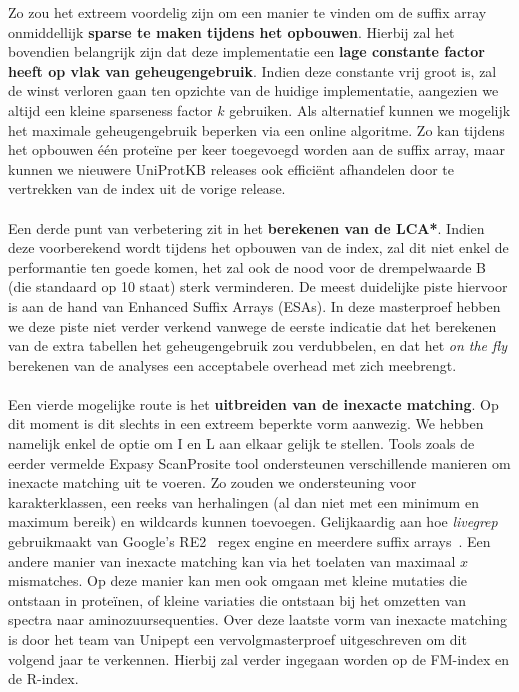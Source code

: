 Zo zou het extreem voordelig zijn om een manier te vinden om de suffix array onmiddellijk \textbf{sparse te maken tijdens het opbouwen}.
Hierbij zal het bovendien belangrijk zijn dat deze implementatie een \textbf{lage constante factor heeft op vlak van geheugengebruik}.
Indien deze constante vrij groot is, zal de winst verloren gaan ten opzichte van de huidige implementatie, aangezien we altijd een kleine sparseness factor $k$ gebruiken.
Als alternatief kunnen we mogelijk het maximale geheugengebruik beperken via een online algoritme.
Zo kan tijdens het opbouwen één proteïne per keer toegevoegd worden aan de suffix array, maar kunnen we nieuwere UniProtKB releases ook efficiënt afhandelen door te vertrekken van de index uit de vorige release.
\\ \\
Een derde punt van verbetering zit in het \textbf{berekenen van de LCA*}.
Indien deze voorberekend wordt tijdens het opbouwen van de index, zal dit niet enkel de performantie ten goede komen, het zal ook de nood voor de drempelwaarde B (die standaard op 10 staat) sterk verminderen.
De meest duidelijke piste hiervoor is aan de hand van Enhanced Suffix Arrays (ESAs).
In deze masterproef hebben we deze piste niet verder verkend vanwege de eerste indicatie dat het berekenen van de extra tabellen het geheugengebruik zou verdubbelen, en dat het \textit{on the fly} berekenen van de analyses een acceptabele overhead met zich meebrengt.
\\ \\
Een vierde mogelijke route is het \textbf{uitbreiden van de inexacte matching}.
Op dit moment is dit slechts in een extreem beperkte vorm aanwezig.
We hebben namelijk enkel de optie om I en L aan elkaar gelijk te stellen.
Tools zoals de eerder vermelde Expasy ScanProsite tool ondersteunen verschillende manieren om inexacte matching uit te voeren.
Zo zouden we ondersteuning voor karakterklassen, een reeks van herhalingen (al dan niet met een minimum en maximum bereik) en wildcards kunnen toevoegen.
Gelijkaardig aan hoe \textit{livegrep}~\cite{livegrep} gebruikmaakt van Google's RE2~\cite{re2} regex engine en meerdere suffix arrays~\cite{regex_sa}.
Een andere manier van inexacte matching kan via het toelaten van maximaal $x$ mismatches.
Op deze manier kan men ook omgaan met kleine mutaties die ontstaan in proteïnen, of kleine variaties die ontstaan bij het omzetten van spectra naar aminozuursequenties.
Over deze laatste vorm van inexacte matching is door het team van Unipept een vervolgmasterproef uitgeschreven om dit volgend jaar te verkennen.
Hierbij zal verder ingegaan worden op de FM-index en de R-index.